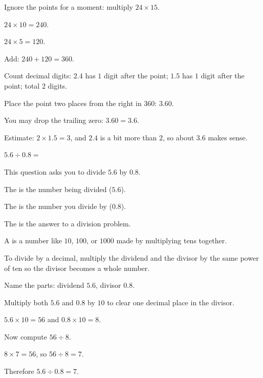 \begin{steps}
  \item Ignore the points for a moment: multiply $24 \times 15$.
  \item $24 \times 10 = 240$.
  \item $24 \times 5 = 120$.
  \item Add: $240 + 120 = 360$.
  \item Count decimal digits: $2.4$ has $1$ digit after the point; $1.5$ has $1$ digit
        after the point; total $2$ digits.
  \item Place the point two places from the right in $360$: $3.60$.
  \item You may drop the trailing zero: $3.60 = 3.6$.
\end{steps}


\noindent Estimate: $2 \times 1.5 = 3$, and $2.4$ is a bit more than $2$, so
about $3.6$ makes sense.


\noindent $5.6 \div 0.8 = $\ansblank{}


\noindent This question asks you to divide $5.6$ by $0.8$.

\begin{words}
  \item The is the number being divided ($5.6$).
  \item The is the number you divide by ($0.8$).
  \item The is the answer to a division problem.
  \item A is a number like $10$, $100$, or $1000$ made by
        multiplying tens together.
  \item To divide by a decimal, multiply the dividend and the divisor by the same
        power of ten so the divisor becomes a whole number.
\end{words}

\begin{steps}
  \item Name the parts: dividend $5.6$, divisor $0.8$.
  \item Multiply both $5.6$ and $0.8$ by $10$ to clear one decimal place in the divisor.
  \item $5.6 \times 10 = 56$ and $0.8 \times 10 = 8$.
  \item Now compute $56 \div 8$.
  \item $8 \times 7 = 56$, so $56 \div 8 = 7$.
  \item Therefore $5.6 \div 0.8 = 7$.
\end{steps}

